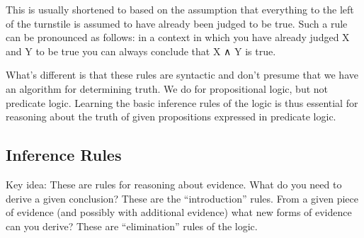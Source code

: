 \documentclass[letterpaper,10pt,english]{sphinxmanual}
\begin{document}
\sphinxAtStartPar
This is usually shortened to  based on the
assumption that everything to the left of the turnstile
is assumed to have already been judged to be true. Such
a rule can be pronounced as follows: in a context in which
you have already judged X and Y to be true you can always
conclude that X ∧ Y is true.

\sphinxAtStartPar
What’s different is that these rules are syntactic and
don’t presume that we have an algorithm for determining
truth. We do for propositional logic, but not predicate
logic. Learning the basic inference rules of the logic
is thus essential for reasoning about the truth of given
propositions expressed in predicate logic.

\begin{sphinxVerbatim}[commandchars=\\\{\}]
 
 
\end{sphinxVerbatim}


\subsection{Inference Rules}
\label{\detokenize{A_01_Propositional_Logic:id10}}
\sphinxAtStartPar
Key idea: These are rules for reasoning about evidence.
What  do you need to derive a given conclusion?
These are the “introduction” rules. From a given piece of
evidence (and possibly with additional evidence) what new
forms of evidence can you derive? These are “elimination”
rules of the logic.
\end{document}
